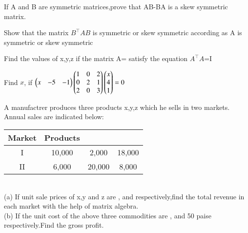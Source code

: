  \item If A and B are symmetric matrices,prove that AB-BA is a skew symmetric matrix.\\
  \item Show that the matrix $ B^{\top}AB$ is symmetric or skew symmetric according as A is symmetric or skew symmetric\\
  \solution
  
  
  \item Find the values of x,y,z if the matrix A= satisfy the equation $A^{\top}A$=I\\
  \solution
  
  
  \item Find $x$, if $\begin{pmatrix}x &-5 &-1\end{pmatrix}\begin{pmatrix}1 &0 &2\\0 &2 &1\\2 &0 &3\end{pmatrix}\begin{pmatrix}x\\4\\1\end{pmatrix}=0$\\
\solution

  \item A manufactrer produces three products x,y,z which he sells in two markets. Annual sales are indicated below:\\
 
  \begin{tabular}{cccc}
  \hline
  Market & Products\\
  \hline
  I &10,000 &2,000 &18,000\\
  \hline
  II &6,000 &20,000 &8,000\\
  \hline
  \end{tabular}\\
  (a) If unit sale prices of x,y and z are , and  respectively,find the total revenue in each market with the help of matrix algebra.\\
  (b) If the unit cost of the above three commodities are , and 50 paise respectively.Find the gross profit.\\
  \solution
  

